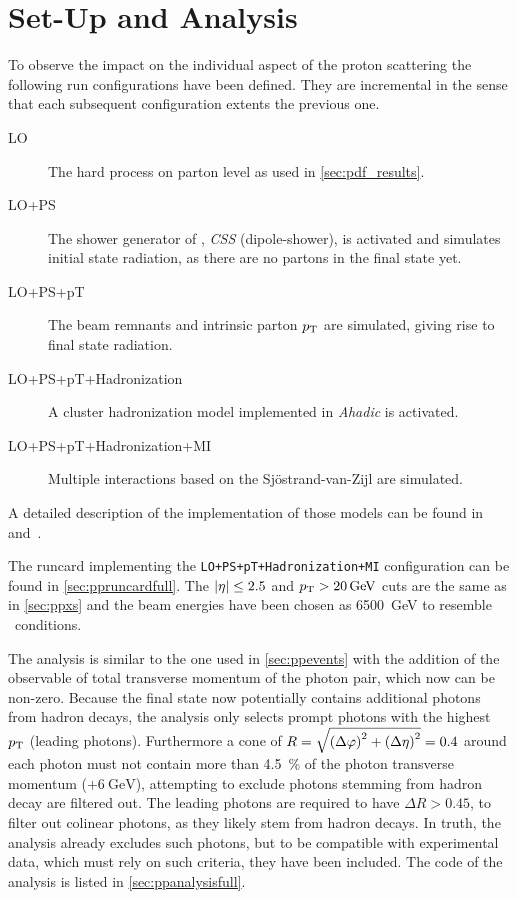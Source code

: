 \section{Set-Up and Analysis}%
\label{sec:setupan}

To observe the impact on the individual aspect of the proton
scattering the following run configurations have been defined. They
are incremental in the sense that each subsequent configuration
extents the previous one.

\begin{description}
\item[LO] The hard process on parton level as used in \cref{sec:pdf_results}.
\item[LO+PS] The shower generator of \sherpa, \emph{CSS} (dipole-shower),
  is activated and simulates initial state radiation, as there are no
  partons in the final state yet.
\item[LO+PS+pT] The beam remnants and intrinsic parton
  \(p_\mathrm{T}\) are simulated, giving rise to final state radiation.
\item[LO+PS+pT+Hadronization] A cluster hadronization model
  implemented in \emph{Ahadic} is activated.
\item[LO+PS+pT+Hadronization+MI] Multiple interactions based on the
  Sj\"ostrand-van-Zijl are simulated.
\end{description}

A detailed description of the implementation of those models can be
found in~\cite{Gleisberg:2008ta} and~\cite{Bothmann:2019yzt}.

The runcard implementing the \texttt{LO+PS+pT+Hadronization+MI}
configuration can be found in \cref{sec:ppruncardfull}. The
\(\abs{\eta}\leq 2.5\) and \(p_\mathrm{T} > \SI{20}{\giga\electronvolt}\) cuts are
the same as in \cref{sec:ppxs} and the beam energies have been chosen
as \SI{6500}{\giga\electronvolt} to resemble \lhc\ conditions.

The analysis is similar to the one used in \cref{sec:ppevents} with
the addition of the observable of total transverse momentum of the
photon pair, which now can be non-zero. Because the final state now
potentially contains additional photons from hadron decays, the
analysis only selects prompt photons with the highest \(p_\mathrm{T}\) (leading
photons). Furthermore a cone of
\(R = \sqrt{\qty(\Delta\varphi)^2 + \qty(\Delta\eta)^2} = 0.4\) around
each photon must not contain more than \SI{4.5}{\percent} of the
photon transverse momentum (\(+ \SI{6}{\giga\electronvolt}\)),
attempting to exclude photons stemming from hadron decay are filtered
out. The leading photons are required to have \(\Delta R > 0.45\), to
filter out colinear photons, as they likely stem from hadron
decays. In truth, the analysis already excludes such photons, but to
be compatible with experimental data, which must rely on such
criteria, they have been included. The code of the analysis is listed
in \cref{sec:ppanalysisfull}.



